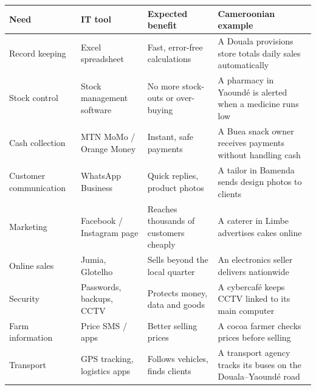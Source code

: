 \documentclass[11pt]{article}
\begin{document}
\begin{center}
\begin{tabularx}{\linewidth}{|l|l|X|X|}
\hline
\rowcolor{popblueL} \textbf{Need} & \textbf{IT tool} & \textbf{Expected benefit} & \textbf{Cameroonian example} \\
\hline
Record keeping & Excel spreadsheet & Fast, error-free calculations & A Douala provisions store totals daily sales automatically \\
\hline
Stock control & Stock management software & No more stock-outs or over-buying & A pharmacy in Yaound\'e is alerted when a medicine runs low \\
\hline
Cash collection & MTN MoMo / Orange Money & Instant, safe payments & A Buea snack owner receives payments without handling cash \\
\hline
Customer communication & WhatsApp Business & Quick replies, product photos & A tailor in Bamenda sends design photos to clients \\
\hline
Marketing & Facebook / Instagram page & Reaches thousands of customers cheaply & A caterer in Limbe advertises cakes online \\
\hline
Online sales & Jumia, Glotelho & Sells beyond the local quarter & An electronics seller delivers nationwide \\
\hline
Security & Passwords, backups, CCTV & Protects money, data and goods & A cybercaf\'e keeps CCTV linked to its main computer \\
\hline
Farm information & Price SMS / apps & Better selling prices & A cocoa farmer checks prices before selling \\
\hline
Transport & GPS tracking, logistics apps & Follows vehicles, finds clients & A transport agency tracks its buses on the Douala--Yaound\'e road \\
\hline
\end{tabularx}
\end{center}
\end{document}
